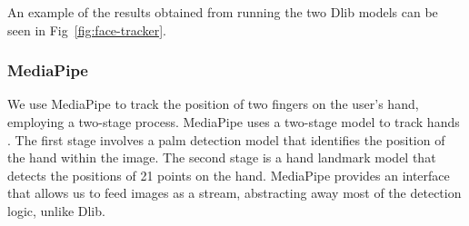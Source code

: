 An example of the results obtained from running the two Dlib models can be seen in Fig~\ref{fig:face-tracker}.

\begin{invisBox}
    \hfill
\end{invisBox}

\subsubsection{MediaPipe}
We use MediaPipe to track the position of two fingers on the user's hand, employing a two-stage process. MediaPipe uses a two-stage model to track hands \cite{zhang2020mediapipe}. The first stage involves a palm detection model that identifies the position of the hand within the image. The second stage is a hand landmark model that detects the positions of 21 points on the hand. MediaPipe provides an interface that allows us to feed images as a stream, abstracting away most of the detection logic, unlike Dlib. \\

